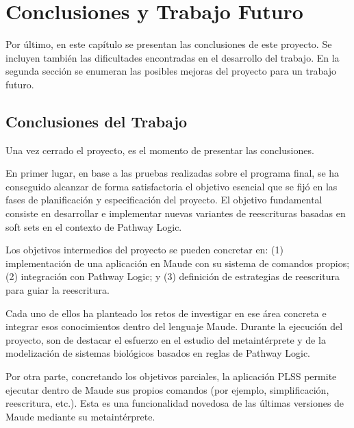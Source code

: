 
\chapter{Conclusiones y Trabajo Futuro}
\label{cap:conclusiones}



Por último, en este capítulo se presentan las conclusiones de este proyecto. Se incluyen también las dificultades encontradas en el desarrollo del trabajo. En la segunda sección se enumeran las posibles mejoras del proyecto para un trabajo futuro.


\section{Conclusiones del Trabajo}

Una vez cerrado el proyecto, es el momento de presentar las conclusiones.

En primer lugar, en base a las pruebas realizadas sobre el programa final, se ha conseguido alcanzar de forma satisfactoria el objetivo esencial que se fijó en las fases de planificación y especificación del proyecto.
El objetivo fundamental consiste en desarrollar e implementar nuevas variantes de reescrituras basadas en soft sets en el contexto de Pathway Logic.%
\smallskip

Los objetivos intermedios del proyecto se pueden concretar en:
(1) implementación de una aplicación en Maude con su sistema de comandos propios; 
(2) integración con Pathway Logic; y
(3) definición de estrategias de reescritura para guiar la reescritura.

Cada uno de ellos ha planteado los retos de investigar en ese área concreta e integrar esos conocimientos dentro del lenguaje Maude.
Durante la ejecución del proyecto, son de destacar el esfuerzo en el estudio del metaintérprete y de la modelización de sistemas biológicos basados en reglas de Pathway Logic.
\smallskip

Por otra parte, concretando los objetivos parciales, la aplicación PLSS permite ejecutar dentro de Maude sus propios comandos (por ejemplo, simplificación, reescritura, etc.). Esta es una funcionalidad novedosa de las últimas versiones de Maude mediante su metaintérprete.

